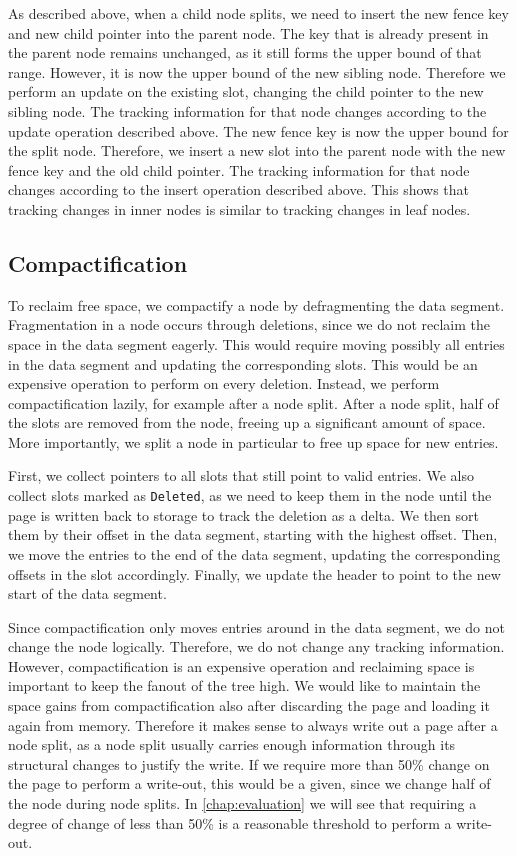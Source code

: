 As described above, when a child node splits, we need to insert the new fence key and new child pointer into the parent node.
The key that is already present in the parent node remains unchanged, as it still forms the upper bound of that range.
However, it is now the upper bound of the new sibling node. Therefore we perform an update on the existing slot, changing the child pointer to the new sibling node.
The tracking information for that node changes according to the update operation described above.
The new fence key is now the upper bound for the split node. 
Therefore, we insert a new slot into the parent node with the new fence key and the old child pointer.
The tracking information for that node changes according to the insert operation described above.
This shows that tracking changes in inner nodes is similar to tracking changes in leaf nodes.

\subsection*{Compactification}
To reclaim free space, we compactify a node by defragmenting the data segment.
Fragmentation in a node occurs through deletions, since we do not reclaim the space in the data segment eagerly.
This would require moving possibly all entries in the data segment and updating the corresponding slots.
This would be an expensive operation to perform on every deletion.
Instead, we perform compactification lazily, for example after a node split.
After a node split, half of the slots are removed from the node, freeing up a significant amount of space.
More importantly, we split a node in particular to free up space for new entries.

First, we collect pointers to all slots that still point to valid entries.
We also collect slots marked as \texttt{Deleted}, as we need to keep them in the node until the page is written back to storage to track the deletion as a delta.
We then sort them by their offset in the data segment, starting with the highest offset.
Then, we move the entries to the end of the data segment, updating the corresponding offsets in the slot accordingly.
Finally, we update the header to point to the new start of the data segment.

Since compactification only moves entries around in the data segment, we do not change the node logically.
Therefore, we do not change any tracking information.
However, compactification is an expensive operation and reclaiming space is important to keep the fanout of the tree high.
We would like to maintain the space gains from compactification also after discarding the page and loading it again from memory.
Therefore it makes sense to always write out a page after a node split, as a node split usually carries enough information through its structural changes to justify the write.
If we require more than 50\% change on the page to perform a write-out, this would be a given, since we change half of the node during node splits.
In \autoref{chap:evaluation} we will see that requiring a degree of change of less than 50\% is a reasonable threshold to perform a write-out.

